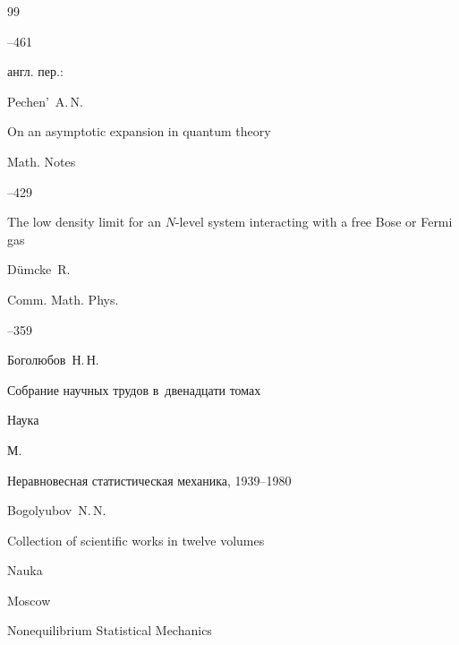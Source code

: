 \begin{thebibliography}{99}



--461

\transl англ. пер.:~

\by Pechen'~A.\,N.

\paper On an asymptotic expansion in quantum theory

\jour Math. Notes




--429






\paper The low density limit for an $N$-level system interacting with a free Bose or Fermi gas

\by    D\"umcke~R.

\jour Comm. Math. Phys.




--359








\by Боголюбов~Н.\,Н.

\book Собрание научных трудов в~двенадцати томах



\publ Наука

\publaddr М.


\volinfo Неравновесная статистическая механика, 1939--1980

\misctransl

\by Bogolyubov~N.\,N.

\book Collection of scientific works in twelve volumes



\publ Nauka

\publaddr Moscow


\volinfo Nonequilibrium Statistical Mechanics






\end{thebibliography}
